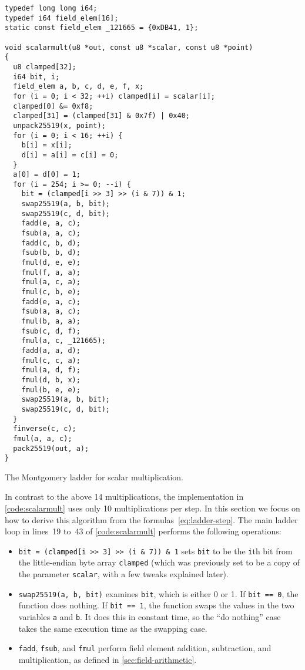 \documentclass[manuscript]{acmart}
\begin{document}
\begin{listing}
\begin{verbatim}
typedef long long i64;
typedef i64 field_elem[16];
static const field_elem _121665 = {0xDB41, 1};

void scalarmult(u8 *out, const u8 *scalar, const u8 *point)
{
  u8 clamped[32];
  i64 bit, i;
  field_elem a, b, c, d, e, f, x;
  for (i = 0; i < 32; ++i) clamped[i] = scalar[i];
  clamped[0] &= 0xf8;
  clamped[31] = (clamped[31] & 0x7f) | 0x40;
  unpack25519(x, point);
  for (i = 0; i < 16; ++i) {
    b[i] = x[i];
    d[i] = a[i] = c[i] = 0;
  }
  a[0] = d[0] = 1;
  for (i = 254; i >= 0; --i) {
    bit = (clamped[i >> 3] >> (i & 7)) & 1;
    swap25519(a, b, bit);
    swap25519(c, d, bit);
    fadd(e, a, c);
    fsub(a, a, c);
    fadd(c, b, d);
    fsub(b, b, d);
    fmul(d, e, e);
    fmul(f, a, a);
    fmul(a, c, a);
    fmul(c, b, e);
    fadd(e, a, c);
    fsub(a, a, c);
    fmul(b, a, a);
    fsub(c, d, f);
    fmul(a, c, _121665);
    fadd(a, a, d);
    fmul(c, c, a);
    fmul(a, d, f);
    fmul(d, b, x);
    fmul(b, e, e);
    swap25519(a, b, bit);
    swap25519(c, d, bit);
  }
  finverse(c, c);
  fmul(a, a, c);
  pack25519(out, a);
}
\end{verbatim}
\caption{The Montgomery ladder for scalar multiplication.}\label{code:scalarmult}
\end{listing}

In contrast to the above 14 multiplications, the implementation in \autoref{code:scalarmult} uses only 10 multiplications per step.
In this section we focus on how to derive this algorithm from the formulas~\eqref{eq:ladder-step}.
The main ladder loop in lines~19 to~43 of \autoref{code:scalarmult} performs the following operations:
\begin{itemize}
    \item \verb|bit = (clamped[i >> 3] >> (i & 7)) & 1| sets \verb|bit| to be the \verb|i|th bit from the little-endian byte array \verb|clamped| (which was previously set to be a copy of the parameter \verb|scalar|, with a few tweaks explained later).
    \item \verb|swap25519(a, b, bit)| examines \verb|bit|, which is either 0 or 1.
        If \verb|bit == 0|, the function does nothing.
        If \verb|bit == 1|, the function swaps the values in the two variables \verb|a| and \verb|b|.
        It does this in constant time, so the ``do nothing'' case takes the same execution time as the swapping case.
    \item \verb|fadd|, \verb|fsub|, and \verb|fmul| perform field element addition, subtraction, and multiplication, as defined in \autoref{sec:field-arithmetic}.
\end{itemize}
\end{document}
